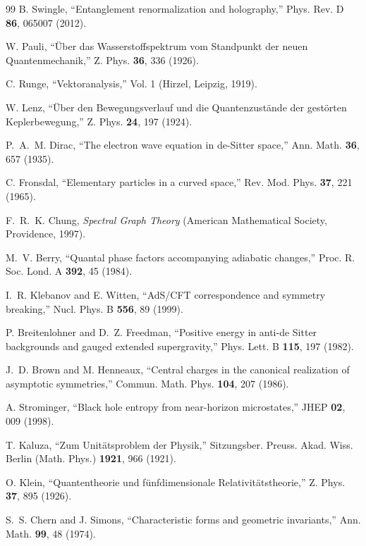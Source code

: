 \documentclass[aps,prd,twocolumn,superscriptaddress,floatfix]{revtex4-2}
\begin{document}
\begin{thebibliography}{99}
B. Swingle,
``Entanglement renormalization and holography,''
Phys. Rev. D \textbf{86}, 065007 (2012).

W. Pauli,
``Über das Wasserstoffspektrum vom Standpunkt der neuen Quantenmechanik,''
Z. Phys. \textbf{36}, 336 (1926).

C. Runge,
``Vektoranalysis,''
Vol. 1 (Hirzel, Leipzig, 1919).

W. Lenz,
``Über den Bewegungsverlauf und die Quantenzustände der gestörten Keplerbewegung,''
Z. Phys. \textbf{24}, 197 (1924).

P.~A.~M. Dirac,
``The electron wave equation in de-Sitter space,''
Ann. Math. \textbf{36}, 657 (1935).

C. Fronsdal,
``Elementary particles in a curved space,''
Rev. Mod. Phys. \textbf{37}, 221 (1965).

F.~R.~K. Chung,
\textit{Spectral Graph Theory}
(American Mathematical Society, Providence, 1997).

M.~V. Berry,
``Quantal phase factors accompanying adiabatic changes,''
Proc. R. Soc. Lond. A \textbf{392}, 45 (1984).

I.~R. Klebanov and E. Witten,
``AdS/CFT correspondence and symmetry breaking,''
Nucl. Phys. B \textbf{556}, 89 (1999).

P. Breitenlohner and D.~Z. Freedman,
``Positive energy in anti-de Sitter backgrounds and gauged extended supergravity,''
Phys. Lett. B \textbf{115}, 197 (1982).

J.~D. Brown and M. Henneaux,
``Central charges in the canonical realization of asymptotic symmetries,''
Commun. Math. Phys. \textbf{104}, 207 (1986).

A. Strominger,
``Black hole entropy from near-horizon microstates,''
JHEP \textbf{02}, 009 (1998).

T. Kaluza,
``Zum Unitätsproblem der Physik,''
Sitzungsber. Preuss. Akad. Wiss. Berlin (Math. Phys.) \textbf{1921}, 966 (1921).

O. Klein,
``Quantentheorie und fünfdimensionale Relativitätstheorie,''
Z. Phys. \textbf{37}, 895 (1926).

S.~S. Chern and J. Simons,
``Characteristic forms and geometric invariants,''
Ann. Math. \textbf{99}, 48 (1974).


\end{thebibliography}
\end{document}
